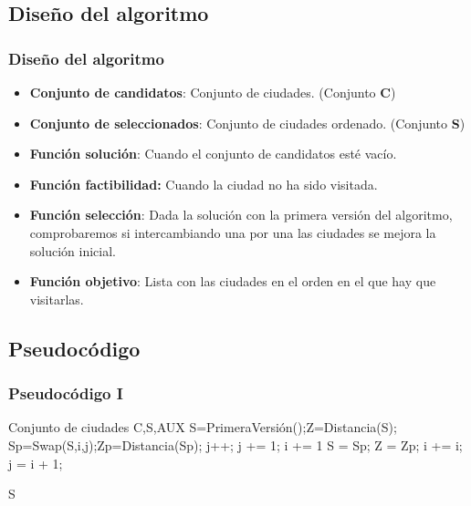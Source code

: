 \documentclass{beamer}
\begin{document}
\subsection{Diseño del algoritmo} 
\begin{frame}
	\frametitle{Diseño del algoritmo}
	\begin{itemize}
		\item \textbf{Conjunto de candidatos}: Conjunto de ciudades. (Conjunto \textbf{C})
		\item \textbf{Conjunto de seleccionados}: Conjunto de ciudades ordenado. (Conjunto \textbf{S})
		\item \textbf{Función solución}: Cuando el conjunto de candidatos esté vacío.
		\item \textbf{Función factibilidad:} Cuando la ciudad no ha sido visitada.
		\item \textbf{Función selección}: Dada la solución con la primera versión del algoritmo, comprobaremos si intercambiando una por una las ciudades se mejora la solución inicial.
		\item \textbf{Función objetivo}: Lista con las ciudades en el orden en el que hay que visitarlas.		
	\end{itemize}
	
\end{frame}

\subsection{Pseudocódigo}
\begin{frame}
	\frametitle{Pseudocódigo I}
	\begin{algorithmic}				
		\Require Conjunto de ciudades C,S,AUX
		\State S=PrimeraVersión();Z=Distancia(S);
			\State Sp=Swap(S,i,j);Zp=Distancia(Sp);
				\State j++;
			\EndIf
				\State j += 1; i += 1
			\EndIf
				\State S = Sp; Z = Zp;
				\State i += i; j = i + 1;
			\EndIf
		\EndWhile  
		
		\Return S	
		
		
		
	\end{algorithmic}
	
	
\end{frame}
\end{document}
